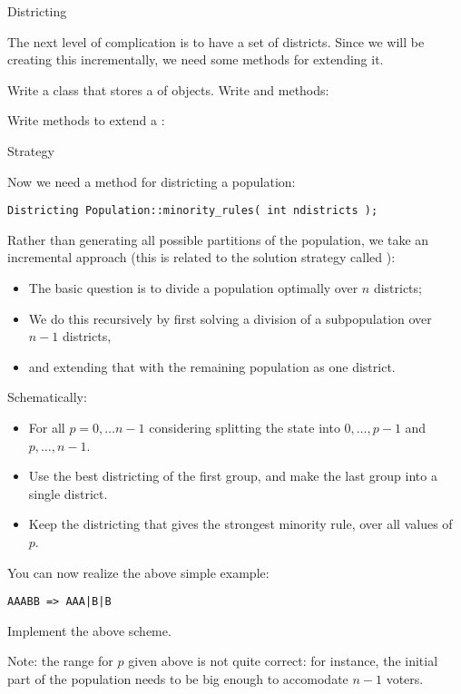  {Districting}

The next level of complication is to have a set of districts.
Since we
will be creating this incrementally, we need some methods for
extending it.

\begin{exercise}
  Write a class  that stores a  of
   objects. Write  and  methods:
\end{exercise}

\begin{exercise}
  Write methods to extend a :
\end{exercise}

 {Strategy}

Now we need a method for districting a population:
\begin{lstlisting}
Districting Population::minority_rules( int ndistricts );
\end{lstlisting}
Rather than generating all possible partitions of the population, we
take an incremental approach (this is related to the solution strategy
called ):
\begin{itemize}
\item The basic question is to divide a population optimally over $n$
  districts;
\item We do this recursively by first solving a division of a subpopulation over $n-1$
  districts,
  \item and extending that with the remaining population as one district.
\end{itemize}
Schematically:
\begin{itemize}
\item For all $p=0,\ldots n-1$ considering splitting the state into
  $0,\ldots,p-1$ and $p,\ldots,n-1$.
\item Use the best districting of the first group, and make the last
  group into a single district.
\item Keep the districting that gives the strongest minority rule,
  over all values of~$p$.
\end{itemize}

You can now realize the above simple example:
\begin{verbatim}
AAABB => AAA|B|B
\end{verbatim}

\begin{exercise}
  Implement the above scheme.

  Note: the range for $p$ given above is not quite correct: for instance,
  the initial part of the population needs to be big enough to
  accomodate $n-1$ voters.
\end{exercise}

